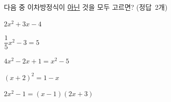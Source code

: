 다음 중 이차방정식이 \underline{아닌} 것을 모두 고르면? \mbox{(정답 2개)}
\begin{choicesii}{\rule[-3ex]{0pt}{8ex}$2x^2+3x-4$}{\rule[-3ex]{0pt}{8ex}$\dfrac{1}{5}x^2-3=5$}{\rule[-3ex]{0pt}{8ex}$4x^2-2x+1=x^2-5$}{\rule[-3ex]{0pt}{8ex}$(x+2)^2=1-x$}{\rule[-3ex]{0pt}{8ex}$2x^2-1=(x-1)(2x+3)$}\end{choicesii}
